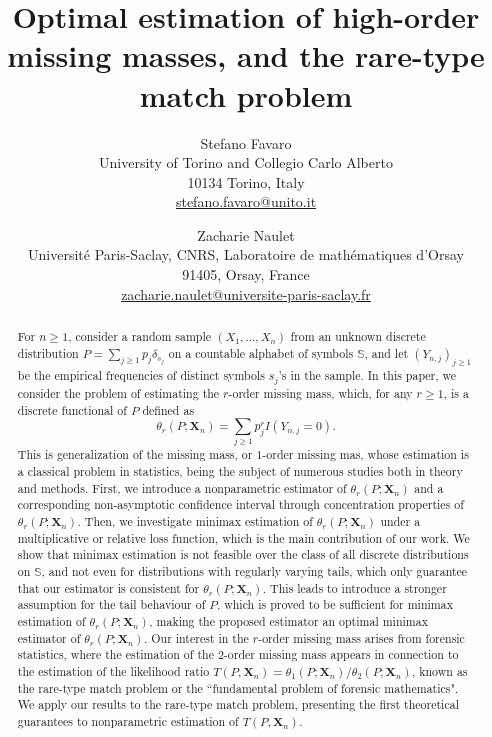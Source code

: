 \documentclass{article}
\title{Optimal estimation of high-order missing masses, and the rare-type match problem}
\author{%
  Stefano Favaro\\
  University of Torino and Collegio Carlo Alberto\\
  10134 Torino, Italy\\
  \url{stefano.favaro@unito.it}
  \and
  Zacharie Naulet\\Université Paris-Saclay, CNRS, Laboratoire de mathématiques d’Orsay\\
  91405, Orsay, France\\
  \url{zacharie.naulet@universite-paris-saclay.fr}}
\date{}
\newcommand{\1}{\boldsymbol{1}}
\theoremstyle{plain}
\begin{document}
\maketitle


\begin{abstract}
For $n\geq1$, consider a random sample $(X_{1},\ldots,X_{n})$ from an unknown discrete distribution $P=\sum_{j\geq1}p_{j}\delta_{s_{j}}$ on a countable alphabet of symbols $\mathbb{S}$, and let $(Y_{n,j})_{j\geq1}$ be the empirical frequencies of distinct symbols $s_{j}$'s in the sample. In this paper, we consider the problem of estimating the $r$-order missing mass, which, for any $r\geq1$, is a discrete functional of $P$ defined as
\begin{displaymath}
\theta_{r}(P;\mathbf{X}_{n})=\sum_{j\geq1}p^{r}_{j}I(Y_{n,j}=0).
\end{displaymath}
This is generalization of the missing mass, or $1$-order missing mas, whose estimation is a classical problem in statistics, being the subject of numerous studies both in theory and methods. First, we introduce a nonparametric estimator of $\theta_{r}(P;\mathbf{X}_{n})$ and a corresponding non-asymptotic confidence interval through concentration properties of $\theta_{r}(P;\mathbf{X}_{n})$. Then, we investigate minimax estimation of $\theta_{r}(P;\mathbf{X}_{n})$ under a multiplicative or relative loss function, which is the main contribution of our work. We show that minimax estimation is not feasible over the class of all discrete distributions on $\mathbb{S}$, and not even for distributions with regularly varying tails, which only guarantee that our estimator is consistent for $\theta_{r}(P;\mathbf{X}_{n})$. This leads to introduce a stronger assumption for the tail behaviour of $P$, which is proved to be sufficient for minimax estimation of $\theta_r(P;\mathbf{X}_{n})$, making the proposed estimator an optimal minimax estimator of $\theta_{r}(P;\mathbf{X}_{n})$. Our interest in the $r$-order missing mass arises from forensic statistics, where the estimation of the $2$-order missing mass appears in connection to the estimation of the likelihood ratio $T(P,\mathbf{X}_{n})=\theta_{1}(P;\mathbf{X}_{n})/\theta_{2}(P;\mathbf{X}_{n})$, known as the rare-type match problem or the ``fundamental problem of forensic mathematics". We apply our results to the rare-type match problem, presenting the first theoretical guarantees to nonparametric estimation of $T(P,\mathbf{X}_{n})$.
\end{abstract}

\end{document}
